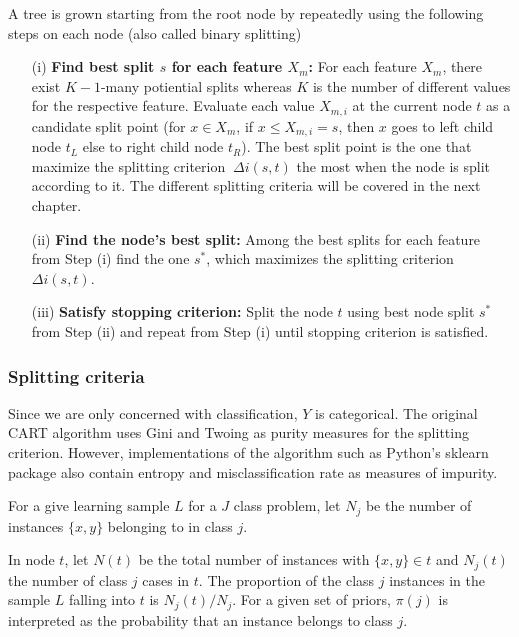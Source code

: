 A tree is grown starting from the root node by repeatedly using the following steps on each
node (also called binary splitting)

\begin{itemize}
    \item[(i)] \textbf{Find best split \(s\) for each feature \(X_{m}\):}
    For each feature \(X_{m}\), there exist \(K-1\)-many potiential splits whereas \(K\) is the number of different values for the respective feature.
    Evaluate each value \(X_{m,i}\) at the current node \(t\) as a candidate split point (for \(x \in X_{m}\), if \(x \leq X_{m,i}=s\),
    then \(x\) goes to left child node \(t_{L}\) else to right child node \(t_{R}\)).
    The best split point is the one that maximize the splitting criterion \(\ \Delta i(s,t) \) the most when the node is split according to it.
    The different splitting criteria will be covered in the next chapter.
    \item[(ii)] \textbf{Find the node’s best split:} Among the best splits for each feature from Step (i) find the one \(s^{*}\), which maximizes the splitting criterion \(\Delta i(s,t)\).
    \item[(iii)] \textbf{Satisfy stopping criterion:} Split the node \(t\) using best node split \(s^{*}\) from Step (ii) and 
    repeat from Step (i) until stopping criterion is satisfied. 
\end{itemize}

\subsubsection{Splitting criteria}
Since we are only concerned with classification, \(Y\) is categorical. The original CART algorithm uses Gini and Twoing as 
purity measures for the splitting criterion. However, implementations of the algorithm such as Python's sklearn package
also contain entropy and misclassification rate as measures of impurity.

For a give learning sample \(L\) for a \(J\) class problem, let \(N_{j}\) be the number of instances \( \{x,y\}  \)
belonging to in class \(j\).

In node \(t\), let \(N(t)\) be the total number of instances with \( \{x,y\} \in t \) and \( N_{j}(t) \) the number of class \(j\)
cases in \(t\). The proportion of the class \(j\) instances in the sample \(L\) falling into \(t\) is  \( N_{j}(t) / N_{j} \).
For a given set of priors, \( \pi(j) \) is interpreted as the probability that an instance belongs to class \(j\).

